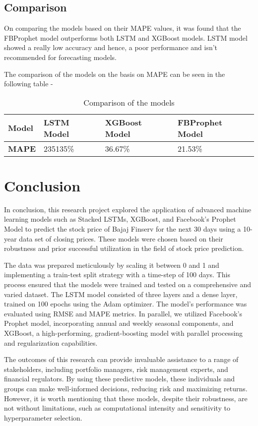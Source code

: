 \documentclass[12pt]{article}
\begin{document}
\subsection{Comparison}
On comparing the models based on their MAPE values, it was found that the FBProphet model outperforms both LSTM and XGBoost models. LSTM model showed a really low accuracy and hence, a poor performance and isn't recommended for forecasting models. 
\pagebreak

The comparison of the models on the basis on MAPE can be seen in the following table -
\begin{table}[h]
\begin{adjustbox}{width=\columnwidth-2.5in,center}
    \centering
\begin{tabular}{@{}llll@{}}
\toprule
\textbf{Model} & \textbf{LSTM Model} & \textbf{XGBoost Model} & \textbf{FBProphet Model} \\ \midrule
\textbf{MAPE}  & 235135\%            & 36.67\%                & 21.53\%                  \\ \bottomrule
\end{tabular}
\end{adjustbox}
\caption{Comparison of the models}
\end{table}
\section{Conclusion}
In conclusion, this research project explored the application of advanced machine learning models such as Stacked LSTMs, XGBoost, and Facebook's Prophet Model to predict the stock price of Bajaj Finserv for the next 30 days using a 10-year data set of closing prices. These models were chosen based on their robustness and prior successful utilization in the field of stock price prediction.

The data was prepared meticulously by scaling it between 0 and 1 and implementing a train-test split strategy with a time-step of 100 days. This process ensured that the models were trained and tested on a comprehensive and varied dataset. The LSTM model consisted of three layers and a dense layer, trained on 100 epochs using the Adam optimizer. The model's performance was evaluated using RMSE and MAPE metrics. In parallel, we utilized Facebook's Prophet model, incorporating annual and weekly seasonal components, and XGBoost, a high-performing, gradient-boosting model with parallel processing and regularization capabilities.

The outcomes of this research can provide invaluable assistance to a range of stakeholders, including portfolio managers, risk management experts, and financial regulators. By using these predictive models, these individuals and groups can make well-informed decisions, reducing risk and maximizing returns. However, it is worth mentioning that these models, despite their robustness, are not without limitations, such as computational intensity and sensitivity to hyperparameter selection.
\end{document}
